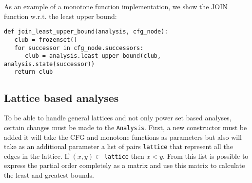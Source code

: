 As an example of a monotone function implementation, we show the JOIN function w.r.t. the least upper bound: 
\begin{verbatim}
def join_least_upper_bound(analysis, cfg_node):
   club = frozenset()
   for successor in cfg_node.successors:
      club = analysis.least_upper_bound(club, analysis.state(successor))
   return club
\end{verbatim}

\subsection{Lattice based analyses}
To be able to handle general lattices and not only power set based analyses, certain changes must be made to the \texttt{Analysis}. First, a new constructor must be added it will take the CFG and monotone functions as parameters but also will take as an additional parameter a list of pairs \texttt{lattice} that represent all the edges in the lattice. If $(x,y) \in$ \texttt{lattice} then $x < y$. From this list is possible to express the partial order completely as a matrix and use this matrix to calculate the least and greatest bounds. 


